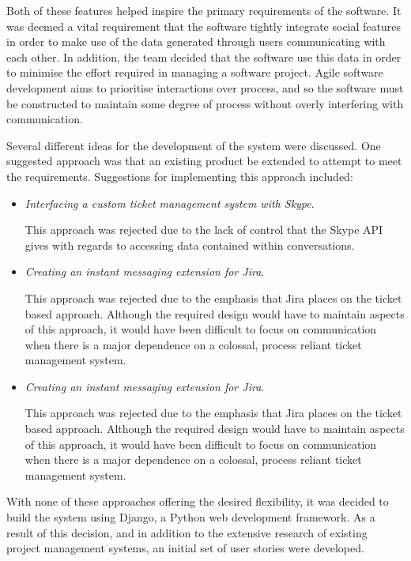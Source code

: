 \documentclass[a4paper]{l3proj}
\begin{document}
Both of these features helped inspire the primary requirements of the software. It was deemed a vital requirement that the software tightly integrate social features in order to make use of the data generated through users communicating with each other. In addition, the team decided that the software use this data in order to minimise the effort required in managing a software project. Agile software development aims to prioritise interactions over process, and so the software must be constructed to maintain some degree of process without overly interfering with communication.

Several different ideas for the development of the system were discussed. One suggested approach was that an existing product be extended to attempt to meet the requirements. Suggestions for implementing this approach included:

\begin{itemize}
\item \textit{Interfacing a custom ticket management system with Skype}. \par This approach was rejected due to the lack of control that the Skype API gives with regards to accessing data contained within conversations.
\item \textit{Creating an instant messaging extension for Jira}. \par This approach was rejected due to the emphasis that Jira places on the ticket based approach. Although the required design would have to maintain aspects of this approach, it would have been difficult to focus on communication when there is a major dependence on a colossal, process reliant ticket management system.

\item \textit{Creating an instant messaging extension for Jira}. \par This approach was rejected due to the emphasis that Jira places on the ticket based approach. Although the required design would have to maintain aspects of this approach, it would have been difficult to focus on communication when there is a major dependence on a colossal, process reliant ticket management system.

\end{itemize}

With none of these approaches offering the desired flexibility, it was decided to build the system using Django, a Python web development framework.  As a result of this decision, and in addition to the extensive research of existing project management systems, an initial set of user stories were developed.
\end{document}
